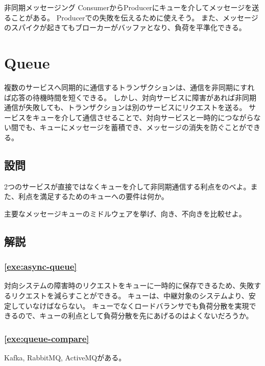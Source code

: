 \documentclass[book]{jlreq}
\begin{document}
\begin{chapter-bib}{非同期メッセージング}
  ConsumerからProducerにキューを介してメッセージを送ることがある\cite{microsoft-messaging}。 
  Producerでの失敗を伝えるために使えそう。
  また、メッセージのスパイクが起きてもブローカーがバッファとなり、負荷を平準化できる。
  \section{Queue} 
  複数のサービスへ同期的に通信するトランザクションは、通信を非同期にすれば応答の待機時間を短くできる。
  しかし、対向サービスに障害があれば非同期通信が失敗しても、トランザクションは別のサービスにリクエストを送る。
  サービスをキューを介して通信させることで、対向サービスと一時的につながらない間でも、キューにメッセージを蓄積でき、メッセージの消失を防ぐことができる\cite{lc-isc}。
  \subsection{設問}
  \begin{exercise}
  \item 2つのサービスが直接ではなくキューを介して非同期通信する利点をのべよ。また、利点を満足するためのキューへの要件は何か。\label{exe:async-queue}
  \item 主要なメッセージキューのミドルウェアを挙げ、向き、不向きを比較せよ。\label{exe:queue-compare}
  \end{exercise}
  \subsection{解説}
  \subsubsection*{\ref{exe:async-queue}}
  対向システムの障害時のリクエストをキューに一時的に保存できるため、失敗するリクエストを減らすことができる\cite{lc-isc}。
  キューは、中継対象のシステムより、安定していなけばならない。
  キューでなくロードバランサでも負荷分散を実現できるので、キューの利点として負荷分散を先にあげるのはよくないだろうか。
  \subsubsection*{\ref{exe:queue-compare}}
  Kafka, RabbitMQ, ActiveMQがある\cite{lc-isc}。
\end{chapter-bib}
\end{document}
